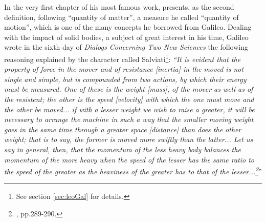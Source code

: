 In the very first chapter of his most famous work, \cite{newton_1999_1} presents, as the second definition, following ``quantity of matter'', a measure he called ``quantity of motion'', which is one of the many concepts he borrowed from Galileo. Dealing with the impact of solid bodies, a subject of great interest in his time, Galileo wrote in the sixth day of \emph{Dialogs Concerning Two New Sciences} the following reasoning explained by the character called Salviati\footnote{See section \ref{sec:leoGal} for details.}: \emph{``It is evident that the property of force in the mover and of resistance [inertia] in the moved is not single and simple, but is compounded from two actions, by which their energy must be measured. One of these is the weight \emph{[mass]}, of the mover as well as of the resistent; the other is the speed \emph{[velocity]} with which the one must move and the other be moved... if with a lesser weight we wish to raise a greater, it will be necessary to arrange the machine in such a way that the smaller moving weight goes in the same time through a greater space \emph{[distance]} than does the other weight; that is to say, the former is moved more swiftly than the latter... Let us say in general, then, that the momentum of the less heavy body balances the momentum of the more heavy when the speed of the lesser has the same ratio to the speed of the greater as the heaviness of the greater has to that of the lesser...\footnote{\cite{galileo_1989_1}, pp.289-290.}}''
